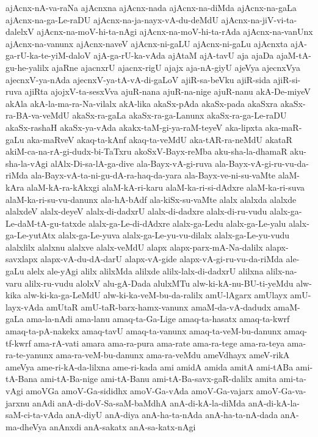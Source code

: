 {ajAcnx-nA-va-raNa
ajAcnxna
ajAcnx-nada
ajAcnx-na-diMda
ajAcnx-na-gaLa
ajAcnx-na-ga-Le-raDU
ajAcnx-na-ja-nayx-vA-du-deMdU
ajAcnx-na-jiV-vi-ta-dalelxV
ajAcnx-na-moV-hi-ta-nAgi
ajAcnx-na-moV-hi-ta-rAda
ajAcnx-na-vanUnx
ajAcnx-na-vanunx
ajAcnx-naveV
ajAcnx-ni-gaLU
ajAcnx-ni-gaLu
ajAcnxta
ajA-ga-rU-ka-te-yiM-daloV
ajA-ga-rU-ka-vAda
ajAtaM
ajA-tavU
aja
ajaDa
ajaM-tA-gu-he-yalilx
ajaRne
ajacnxrU
ajacnx-rigU
ajajx
aja-nA-giyU
ajeVya
ajecnxVya
ajecnxV-ya-nAda
ajecnxV-ya-tA-vA-di-gaLoV
ajiR-sa-beVku
ajiR-sida
ajiR-si-ruva
ajiRta
ajojxV-ta-sesxVva
ajuR-nana
ajuR-na-nige
ajuR-nanu
akA-De-miyeV
akAla
akA-la-ma-ra-Na-vilalx
akA-lika
akaSx-pAda
akaSx-pada
akaSxra
akaSx-ra-BA-va-veMdU
akaSx-ra-gaLa
akaSx-ra-ga-Lanunx
akaSx-ra-ga-Le-raDU
akaSx-rashaH
akaSx-ya-vAda
akakx-taM-gi-ya-raM-teyeV
aka-lipxta
aka-maR-gaLu
aka-maRveV
akaq-ta-kAnf
akaq-ta-veMdU
aka-tAR-ra-neMdU
akataR
akiM-ca-na-rA-gi-dudx-bi-TaTxru
akoSxV-Bayx-reMba
aku-sha-la-dhamaR
aku-sha-la-vAgi
alAlx-Di-sa-lA-ga-dive
ala-Bayx-vA-gi-ruva
ala-Bayx-vA-gi-ru-vu-da-riMda
ala-Bayx-vA-ta-ni-gu-dA-ra-haq-da-yara
ala-Bayx-ve-ni-su-vaMte
alaM-kAra
alaM-kA-ra-kAkxgi
alaM-kA-ri-karu
alaM-ka-ri-si-dAdxre
alaM-ka-ri-suva
alaM-ka-ri-su-vu-danunx
ala-hA-bAdf
ala-kiSx-su-vaMte
alalx
alalxda
alalxde
alalxdeV
alalx-deyeV
alalx-di-dadxrU
alalx-di-dadxre
alalx-di-ru-vudu
alalx-ga-Le-daM-tA-gu-tatxde
alalx-ga-Le-di-dAdxre
alalx-ga-Ledu
alalx-ga-Le-yalu
alalx-ga-Le-yutAtx
alalx-ga-Le-yuva
alalx-ga-Le-yu-vu-dilalx
alalx-ga-Le-yu-vudu
alalxlilx
alalxnu
alalxve
alalx-veMdU
alapx
alapx-parx-mA-Na-dalilx
alapx-savxlapx
alapx-vA-du-dA-darU
alapx-vA-gide
alapx-vA-gi-ru-vu-da-riMda
ale-gaLu
alelx
ale-yAgi
alilx
alilxMda
alilxde
alilx-lalx-di-dadxrU
alilxna
alilx-na-varu
alilx-ru-vudu
alolxV
alu-gA-Dada
alulxMTu
alw-ki-kA-nu-BU-ti-yeMdu
alw-kika
alw-ki-ka-ga-LeMdU
alw-ki-ka-veM-bu-da-ralilx
amU-lAgarx
amUlayx
amU-layx-vAda
amUtaR
amU-taR-barx-hamx-vanunx
amaM-da-vA-dadudx
amaM-gaLa
ama-la-nAdi
ama-lanu
amaq-ta-Ga-Lige
amaq-ta-hasatx
amaq-ta-kwrf
amaq-ta-pA-nakekx
amaq-tavU
amaq-ta-vanunx
amaq-ta-veM-bu-danunx
amaq-tf-kwrf
ama-rA-vati
amara
ama-ra-pura
ama-rate
ama-ra-tege
ama-ra-teya
ama-ra-te-yanunx
ama-ra-veM-bu-danunx
ama-ra-veMdu
ameVdhayx
ameV-rikA
ameVya
ame-ri-kA-da-lilxna
ame-ri-kada
ami
amidA
amida
amitA
ami-tABa
ami-tA-Bana
ami-tA-Ba-nige
ami-tA-Banu
ami-tA-Ba-savx-gaR-dalilx
amita
ami-ta-vAgi
amoVGa
amoV-Ga-sididhx
amoV-Ga-vAda
amoV-Ga-vajarx
amoV-Ga-va-jarxnu
anAdi
anA-di-doV-Sa-saM-baMdhA
anA-di-kA-la-diMda
anA-di-kA-la-saM-ci-ta-vAda
anA-diyU
anA-diya
anA-ha-ta-nAda
anA-ha-ta-nA-dada
anA-ma-dheVya
anAnxdi
anA-sakatx
anA-sa-katx-nAgi
}
